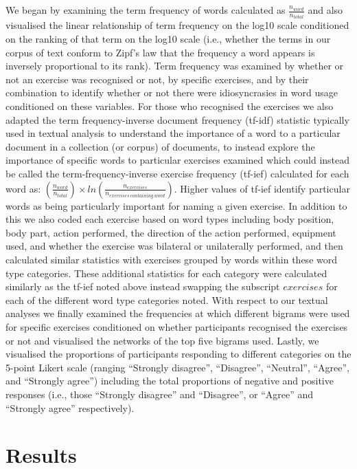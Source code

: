 \documentclass[
]{article}
\begin{document}
We began by examining the term frequency of words calculated as
\(\frac{n_{word}}{n_{total}}\) and also visualised the linear
relationship of term frequency on the log10 scale conditioned on the
ranking of that term on the log10 scale (i.e., whether the terms in our
corpus of text conform to Zipf's law that the frequency a word appears
is inversely proportional to its rank). Term frequency was examined by
whether or not an exercise was recognised or not, by specific exercises,
and by their combination to identify whether or not there were
idiosyncrasies in word usage conditioned on these variables. For those
who recognised the exercises we also adapted the term frequency-inverse
document frequency (tf-idf) statistic typically used in textual analysis
to understand the importance of a word to a particular document in a
collection (or corpus) of documents, to instead explore the importance
of specific words to particular exercises examined which could instead
be called the term-frequency-inverse exercise frequency (tf-ief)
calculated for each word as:
\(\left(\frac{n_{word}}{n_{total}}\right)\times ln \left(\frac{n_{exercises}}{n_{exercises\ containing\ word}}\right)\).
Higher values of tf-ief identify particular words as being particularly
important for naming a given exercise. In addition to this we also coded
each exercise based on word types including body position, body part,
action performed, the direction of the action performed, equipment used,
and whether the exercise was bilateral or unilaterally performed, and
then calculated similar statistics with exercises grouped by words
within these word type categories. These additional statistics for each
category were calculated similarly as the tf-ief noted above instead
swapping the subscript \(exercises\) for each of the different word type
categories noted. With respect to our textual analyses we finally
examined the frequencies at which different bigrams were used for
specific exercises conditioned on whether participants recognised the
exercises or not and visualised the networks of the top five bigrams
used. Lastly, we visualised the proportions of participants responding
to different categories on the 5-point Likert scale (ranging ``Strongly
disagree'', ``Disagree'', ``Neutral'', ``Agree'', and ``Strongly
agree'') including the total proportions of negative and positive
responses (i.e., those ``Strongly disagree'' and ``Disagree'', or
``Agree'' and ``Strongly agree'' respectively).

\section{Results}\label{results}
\end{document}
